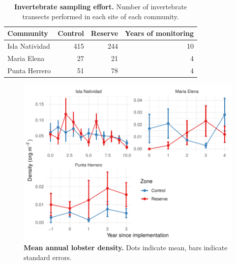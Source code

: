 \documentclass[10pt]{article}
\date{}
\begin{document}

{\Large
\textbf{}
}

\begin{table}[h]
\caption{{\bf Invertebrate sampling effort.} Number of invertebrate transects performed in each site of each community.}
\centering
\begin{tabular}{lrrr}
\toprule
Community & Control & Reserve & Years of monitoring\\
\midrule
Isla Natividad & 415 & 244 & 10\\
Maria Elena & 27 & 21 & 4\\
Punta Herrero & 51 & 78 & 4\\
\bottomrule
\end{tabular}
\end{table}

\begin{figure}[h]
\centering
\includegraphics{img/S1_fig.pdf}
\caption{{\bf Mean annual lobster density.} Dots indicate mean, bars indicate standard errors.}
\end{figure}

\clearpage
\end{document}
